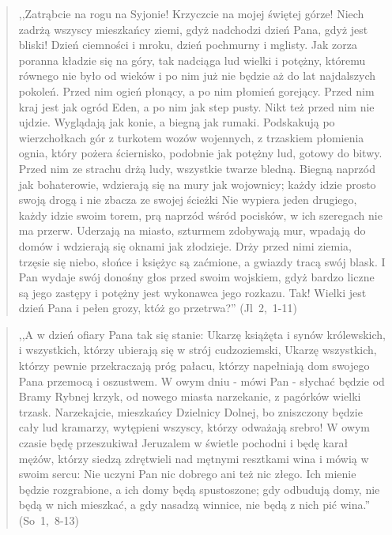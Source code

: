 \documentclass[10pt,a4paper,oneside]{article}
\begin{document}
\begin{quote}
,,Zatrąbcie na rogu na Syjonie! Krzyczcie na mojej świętej górze! Niech zadrżą wszyscy mieszkańcy ziemi, gdyż nadchodzi dzień Pana, gdyż jest bliski! Dzień ciemności i mroku, dzień pochmurny i mglisty. Jak zorza poranna kładzie się na góry, tak nadciąga lud wielki i potężny, któremu równego nie było od wieków i po nim już nie będzie aż do lat najdalszych pokoleń. Przed nim ogień płonący, a po nim płomień gorejący. Przed nim kraj jest jak ogród Eden, a po nim jak step pusty. Nikt też przed nim nie ujdzie. Wyglądają jak konie, a biegną jak rumaki. Podskakują po wierzchołkach gór z turkotem wozów wojennych, z trzaskiem płomienia ognia, który pożera ściernisko, podobnie jak potężny lud, gotowy do bitwy. Przed nim ze strachu drżą ludy, wszystkie twarze bledną. Biegną naprzód jak bohaterowie, wdzierają się na mury jak wojownicy; każdy idzie prosto swoją drogą i nie zbacza ze swojej ścieżki Nie wypiera jeden drugiego, każdy idzie swoim torem, prą naprzód wśród pocisków, w ich szeregach nie ma przerw. Uderzają na miasto, szturmem zdobywają mur, wpadają do domów i wdzierają się oknami jak złodzieje. Drży przed nimi ziemia, trzęsie się niebo, słońce i księżyc są zaćmione, a gwiazdy tracą swój blask. I Pan wydaje swój donośny głos przed swoim wojskiem, gdyż bardzo liczne są jego zastępy i potężny jest wykonawca jego rozkazu. Tak! Wielki jest dzień Pana i pełen grozy, któż go przetrwa?'' \mbox{(Jl 2, 1-11)}
\end{quote}
\begin{quote}
,,A w dzień ofiary Pana tak się stanie: Ukarzę książęta i synów królewskich, i wszystkich, którzy ubierają się w strój cudzoziemski, Ukarzę wszystkich, którzy pewnie przekraczają próg pałacu, którzy napełniają dom swojego Pana przemocą i oszustwem. W owym dniu - mówi Pan - słychać będzie od Bramy Rybnej krzyk, od nowego miasta narzekanie, z pagórków wielki trzask. Narzekajcie, mieszkańcy Dzielnicy Dolnej, bo zniszczony będzie cały lud kramarzy, wytępieni wszyscy, którzy odważają srebro! W owym czasie będę przeszukiwał Jeruzalem w świetle pochodni i będę karał mężów, którzy siedzą zdrętwieli nad mętnymi resztkami wina i mówią w swoim sercu: Nie uczyni Pan nic dobrego ani też nic złego. Ich mienie będzie rozgrabione, a ich domy będą spustoszone; gdy odbudują domy, nie będą w nich mieszkać, a gdy nasadzą winnice, nie będą z nich pić wina.'' \mbox{(So 1, 8-13)}
\end{quote}
\end{document}
